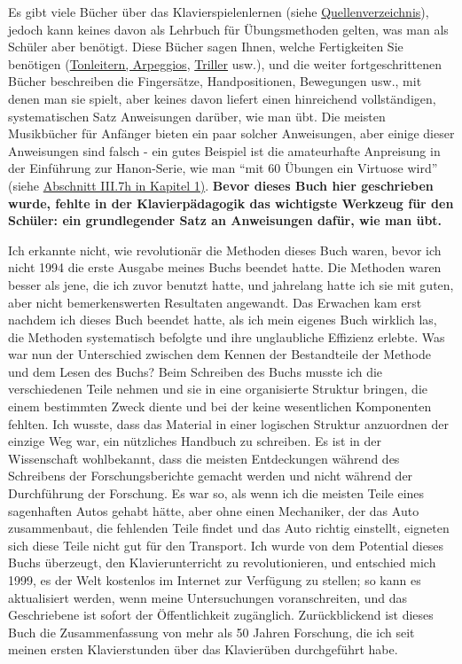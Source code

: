 Es gibt viele Bücher über das Klavierspielenlernen (siehe \hyperlink{reference}{Quellenverzeichnis}), jedoch kann keines davon als Lehrbuch für Übungsmethoden gelten, was man als Schüler aber benötigt.
 Diese Bücher sagen Ihnen, welche Fertigkeiten Sie benötigen (\hyperlink{c1iii5}{Tonleitern, Arpeggios}, \hyperlink{c1iii3}{Triller} usw.), und die weiter fortgeschrittenen Bücher beschreiben die Fingersätze, Handpositionen, Bewegungen usw., mit denen man sie spielt, aber keines davon liefert einen hinreichend vollständigen, systematischen Satz Anweisungen darüber, wie man übt.
 Die meisten Musikbücher für Anfänger bieten ein paar solcher Anweisungen, aber einige dieser Anweisungen sind falsch - ein gutes Beispiel ist die amateurhafte Anpreisung in der Einführung zur Hanon-Serie, wie man \enquote{mit 60 Übungen ein Virtuose wird} (siehe \hyperlink{c1iii7h}{Abschnitt III.7h in Kapitel 1)}.
 \textbf{Bevor dieses Buch hier geschrieben wurde, fehlte in der Klavierpädagogik das wichtigste Werkzeug für den Schüler: ein grundlegender Satz an Anweisungen dafür, wie man übt.}

Ich erkannte nicht, wie revolutionär die Methoden dieses Buch waren, bevor ich nicht 1994 die erste Ausgabe meines Buchs beendet hatte.
 Die Methoden waren besser als jene, die ich zuvor benutzt hatte, und jahrelang hatte ich sie mit guten, aber nicht bemerkenswerten Resultaten angewandt.
 Das Erwachen kam erst nachdem ich dieses Buch beendet hatte, als ich mein eigenes Buch wirklich las, die Methoden systematisch befolgte und ihre unglaubliche Effizienz erlebte.
 Was war nun der Unterschied zwischen dem Kennen der Bestandteile der Methode und dem Lesen des Buchs?
 Beim Schreiben des Buchs musste ich die verschiedenen Teile nehmen und sie in eine organisierte Struktur bringen, die einem bestimmten Zweck diente und bei der keine wesentlichen Komponenten fehlten.
 Ich wusste, dass das Material in einer logischen Struktur anzuordnen der einzige Weg war, ein nützliches Handbuch zu schreiben.
 Es ist in der Wissenschaft wohlbekannt, dass die meisten Entdeckungen während des Schreibens der Forschungsberichte gemacht werden und nicht während der Durchführung der Forschung.
 Es war so, als wenn ich die meisten Teile eines sagenhaften Autos gehabt hätte, aber ohne einen Mechaniker, der das Auto zusammenbaut, die fehlenden Teile findet und das Auto richtig einstellt, eigneten sich diese Teile nicht gut für den Transport.
 Ich wurde von dem Potential dieses Buchs überzeugt, den Klavierunterricht zu revolutionieren, und entschied mich 1999, es der Welt kostenlos im Internet zur Verfügung zu stellen;
 so kann es aktualisiert werden, wenn meine Untersuchungen voranschreiten, und das Geschriebene ist sofort der Öffentlichkeit zugänglich.
 Zurückblickend ist dieses Buch die Zusammenfassung von mehr als 50 Jahren Forschung, die ich seit meinen ersten Klavierstunden über das Klavierüben durchgeführt habe.
 

